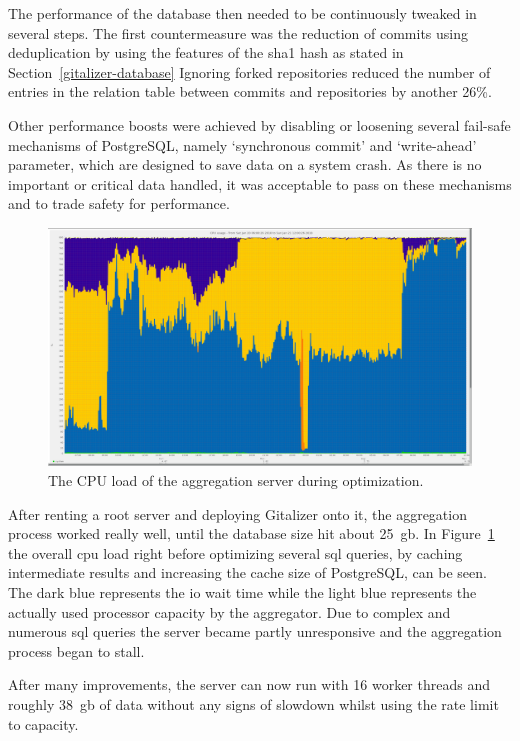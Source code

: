 The performance of the database then needed to be continuously tweaked in several steps.
The first countermeasure was the reduction of commits using deduplication by using the features of the \ac{sha1} hash as stated in Section~\ref{gitalizer-database}
Ignoring forked repositories reduced the number of entries in the relation table between commits and repositories by another 26\%.

Other performance boosts were achieved by disabling or loosening several fail-safe mechanisms of PostgreSQL, namely `synchronous commit' and `write-ahead' parameter, which are designed to save data on a system crash.
As there is no important or critical data handled, it was acceptable to pass on these mechanisms and to trade safety for performance.

\begin{figure}[H]
\includegraphics[scale=0.22]{./graphs/server-graphs/query-refactoring}
\centering
\caption{The CPU load of the aggregation server during optimization.}\label{fig:cpu-load}
\end{figure}

After renting a root server and deploying Gitalizer onto it, the aggregation process worked really well, until the database size hit about 25~\ac{gb}.
In Figure~\ref{fig:cpu-load} the overall \ac{cpu} load right before optimizing several \ac{sql} queries, by caching intermediate results and increasing the cache size of PostgreSQL, can be seen.
The dark blue represents the \ac{io} wait time while the light blue represents the actually used processor capacity by the aggregator.
Due to complex and numerous \ac{sql} queries the server became partly unresponsive and the aggregation process began to stall.

After many improvements, the server can now run with 16 worker threads and roughly 38~\ac{gb} of data without any signs of slowdown whilst using the rate limit to capacity.


